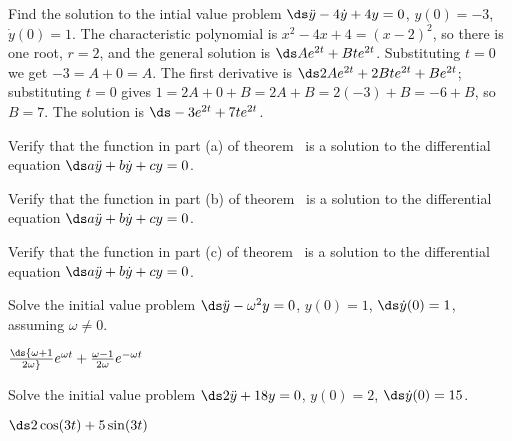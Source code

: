 \begin{example} Find the solution to the intial value problem
$\ds\ddot y-4\dot y+4y=0$, $y(0)=-3$, $\dot y(0)=1$. The
characteristic polynomial is $x^2-4x+4=(x-2)^2$, so there is one root,
$r=2$, 
and the general solution is $\ds Ae^{2t}+Bte^{2t}$. Substituting
$t=0$ we get $-3=A+0=A$. The first derivative is
$\ds 2Ae^{2t}+2Bte^{2t}+Be^{2t}$; substituting $t=0$ gives
$1=2A+0+B=2A+B=2(-3)+B=-6+B$, so $B=7$. The solution is
$\ds -3e^{2t}+7te^{2t}$.
\end{example}

\begin{exercises}

\begin{exercise} Verify that the function in part (a) of
theorem~ is a solution to
the differential equation $\ds a\ddot y+b\dot y+cy=0$.

\begin{exercise} Verify that the function in part (b) of
theorem~ is a solution to
the differential equation $\ds a\ddot y+b\dot y+cy=0$.

\begin{exercise} Verify that the function in part (c) of
theorem~ is a solution to
the differential equation $\ds a\ddot y+b\dot y+cy=0$.

\begin{exercise} Solve the initial value problem $\ds\ddot y-\omega^2y=0$,
$y(0)=1$, $\ds\dot y(0)=1$, assuming $\omega\not=0$.
\begin{answer} $\ds {\omega+1\over2\omega}e^{\omega t}+
{\omega-1\over2\omega}e^{-\omega t}$
\end{answer}\end{exercise}

\begin{exercise} Solve the initial value problem $\ds2\ddot y+18y=0$,
$y(0)=2$, $\ds\dot y(0)=15$.
\begin{answer} $\ds 2\cos(3t)+5\sin(3t)$
\end{answer}\end{exercise}


\end{exercise}
\end{exercise}
\end{exercise}
\end{exercises}
